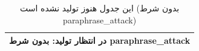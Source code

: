 \begin{table}[H]
\centering
\caption{این جدول هنوز تولید نشده است (بدون شرط paraphrase\_attack)}
\label{tab:v2-attack}
\begin{tabular}{l}
\toprule
در انتظار تولید: بدون شرط paraphrase\_attack \\
\bottomrule
\end{tabular}
\end{table}
